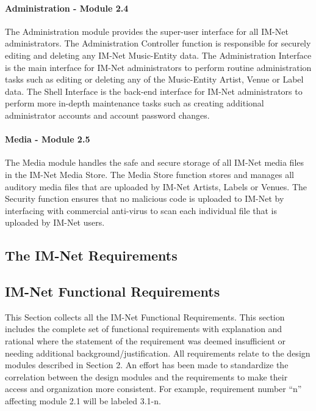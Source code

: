 \documentclass[letterpaper,12pt]{article}
\newcounter{rcounter}							%
\newcommand{\Section}[1]{\section{#1} \setcounter{figure}{0}}
\begin{document}
{\paragraph{Administration - Module 2.4}
The Administration module provides the super-user interface for all IM-Net administrators. The Administration Controller function is responsible for securely editing and deleting any IM-Net Music-Entity data. The Administration Interface is the main interface for IM-Net administrators to perform routine administration tasks such as editing or deleting any of the Music-Entity Artist, Venue or Label data. The Shell Interface is the back-end interface for IM-Net administrators to perform more in-depth maintenance tasks such as creating additional administrator accounts and account password changes. 

\paragraph{Media - Module 2.5}
The Media module handles the safe and secure storage of all IM-Net media files in the IM-Net Media Store. The Media Store function stores and manages all auditory media files that are uploaded by IM-Net Artists, Labels or Venues. The Security function ensures that no malicious code is uploaded to IM-Net by interfacing with commercial anti-virus to scan each individual file that is uploaded by IM-Net users.


\eject

\textcolor{section}{\Section{The IM-Net Requirements}}
 
\textcolor{subsection}{\subsection{IM-Net Functional Requirements}}

This Section collects all the IM-Net Functional Requirements. This section includes the complete set of functional requirements with explanation and rational where the statement of the requirement was deemed insufficient or needing additional background/justification. All requirements relate to the design modules described in Section 2. An effort has been made to standardize the correlation between the design modules and the requirements to make their access and organization more consistent. For example, requirement number ``n'' affecting module 2.1 will be labeled 3.1-n.

\setcounter{rcounter}{0}

}
\end{document}
